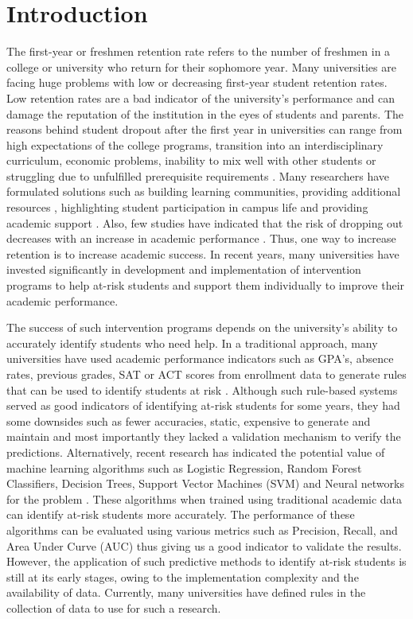 \documentclass[11pt,openright]{report}
\begin{document}
\chapter{Introduction}\label{chapter:introduction} 

The first-year or freshmen retention rate refers to the number of freshmen in a college or university who return for their sophomore year. Many universities are facing huge problems with low or decreasing first-year student retention rates. Low retention rates are a bad indicator of the university's performance and can damage the reputation of the institution in the eyes of students and parents. The reasons behind student dropout after the first year in universities can range from high expectations of the college programs, transition into an interdisciplinary curriculum, economic problems, inability to mix well with other students or struggling due to unfulfilled prerequisite requirements \cite{lau2003institutional}. Many researchers have formulated solutions such as building learning communities, providing additional resources \cite{tinto1999taking}, highlighting student participation in campus life and providing academic support \cite{lau2003institutional}. Also, few studies have indicated that the risk of dropping out decreases with an increase in academic performance \cite{Murtaugh}. Thus, one way to increase retention is to increase academic success. In recent years, many universities have invested significantly in development and implementation of intervention programs to help at-risk students and support them individually to improve their academic performance. 

The success of such intervention programs depends on the university's ability to accurately identify students who need help. In a traditional approach, many universities have used academic performance indicators such as GPA's, absence rates, previous grades, SAT or ACT scores from enrollment data to generate rules that can be used to identify students at risk \cite{bingham2016}. Although such rule-based systems served as good indicators of identifying at-risk students for some years, they had some downsides such as fewer accuracies, static,  expensive to generate and maintain and most importantly they lacked a validation mechanism to verify the predictions. Alternatively, recent research has indicated the potential value of machine learning algorithms such as Logistic Regression, Random Forest Classifiers, Decision Trees, Support Vector Machines (SVM) and Neural networks for the problem \cite{plagge2013using,lakkaraju2015machine,marbouti2016models}. These algorithms when trained using traditional academic data can identify at-risk students more accurately. The performance of these algorithms can be evaluated using various metrics such as Precision, Recall, and Area Under Curve (AUC) thus giving us a good indicator to validate the results. However, the application of such predictive methods to identify at-risk students is still at its early stages, owing to the implementation complexity and the availability of data. Currently, many universities have defined rules in the collection of data to use for such a research.
\end{document}
